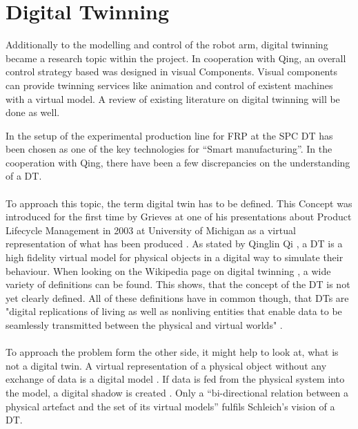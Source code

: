 \chapter{Digital Twinning}

Additionally to the modelling and control of the robot arm, digital twinning became a research topic within the project. In cooperation with Qing, an overall control strategy based was designed in visual Components. Visual components can provide twinning services like animation and control of existent machines with a virtual model.
A review of existing literature on digital twinning will be done as well.\\
\medskip


In the setup of the experimental production line for \ac{FRP} at the \ac{SPC} 
\ac{DT} has been chosen as one of the key technologies for “Smart manufacturing”. In the cooperation with Qing, there have been a few discrepancies on the understanding of a \ac{DT}.\\
\\
To approach this topic, the term digital twin has to be defined.
This Concept was introduced for the first time by Grieves at one of his presentations about Product Lifecycle Management in 2003 at University of Michigan as a virtual representation of what has been produced \cite{GreivesDTfirst}.
As stated by Qinglin Qi \cite{Qi2018DigitalTS}, a \ac{DT} is a high fidelity virtual model for physical objects in a digital way to simulate their behaviour. 
When looking on the Wikipedia page on digital twinning \cite{DTwikip}, a wide variety of definitions can be found. 
This shows, that the concept of the \ac{DT} is not yet clearly defined. All of these definitions have in common though, that \acp{DT} are "digital replications of living as well as nonliving entities that 
enable data to be seamlessly transmitted between the physical and virtual worlds" \cite{SaddikDTmultimconv}.\\
\\
To approach the problem form the other side, it might help to look at, what is not a digital twin.
A virtual representation of a physical object without any exchange of data is a digital model \cite{WongWhatisDT}. 
If data is fed from the physical system into the model, a digital shadow is created \cite{KRITZINGER20181016}.
Only a “bi-directional relation between a physical artefact and the set of its virtual models” \cite{SchleichDTshaping} fulfils Schleich's vision of a \ac{DT}.\\
\\
